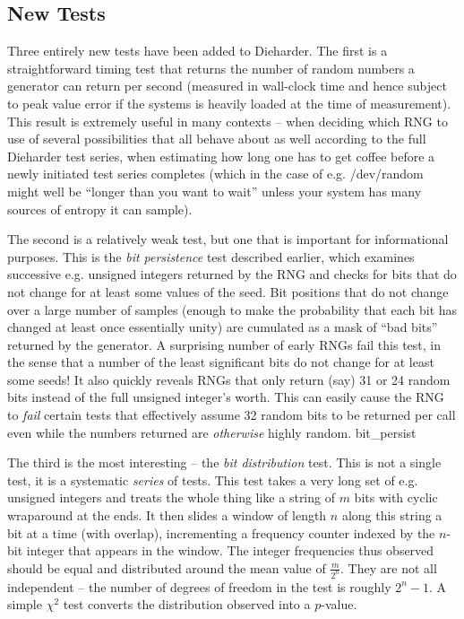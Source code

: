\documentclass[12pt]{article}
\begin{document}
\subsection{New Tests}

Three entirely new tests have been added to Dieharder.  The first is a
straightforward timing test that returns the number of random numbers a
generator can return per second (measured in wall-clock time and hence
subject to peak value error if the systems is heavily loaded at the time
of measurement).  This result is extremely useful in many contexts --
when deciding which RNG to use of several possibilities that all behave
about as well according to the full Dieharder test series, when
estimating how long one has to get coffee before a newly initiated test
series completes (which in the case of e.g. /dev/random might well be
``longer than you want to wait'' unless your system has many sources of
entropy it can sample).

The second is a relatively weak test, but one that is important for
informational purposes.  This is the {\em bit persistence} test
described earlier, which examines successive e.g. unsigned integers
returned by the RNG and checks for bits that do not change for at least
some values of the seed.  Bit positions that do not change over a large
number of samples (enough to make the probability that each bit has
changed at least once essentially unity) are cumulated as a mask of
``bad bits'' returned by the generator.  A surprising number of early
RNGs fail this test, in the sense that a number of the least significant
bits do not change for at least some seeds!  It also quickly reveals
RNGs that only return (say) 31 or 24 random bits instead of the full
unsigned integer's worth.  This can easily cause the RNG to {\em fail}
certain tests that effectively assume 32 random bits to be returned per
call even while the numbers returned are {\em otherwise} highly random.
bit\_persist

The third is the most interesting -- the {\em bit distribution} test.
This is not a single test, it is a systematic {\em series} of tests.
This test takes a very long set of e.g. unsigned integers and treats the
whole thing like a string of $m$ bits with cyclic wraparound at the
ends.  It then slides a window of length $n$ along this string a bit at
a time (with overlap), incrementing a frequency counter indexed by the
$n$-bit integer that appears in the window.  The integer frequencies
thus observed should be equal and distributed around the mean value of
$\frac{m}{2^n}$.  They are not all independent -- the number of degrees
of freedom in the test is roughly $2^n - 1$.  A simple $\chi^2$ test
converts the distribution observed into a $p$-value.
\end{document}
